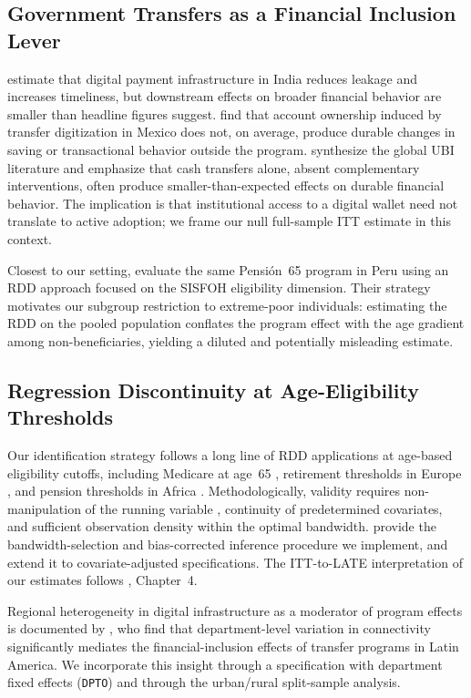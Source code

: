 \documentclass[12pt]{article}
\begin{document}
\subsection{Government Transfers as a Financial Inclusion Lever}

\citet{muralidharan2016} estimate that digital payment infrastructure in
India reduces leakage and increases timeliness, but downstream effects on
broader financial behavior are smaller than headline figures suggest.
\citet{bachas2018} find that account ownership induced by transfer
digitization in Mexico does not, on average, produce durable changes in
saving or transactional behavior outside the program. \citet{banerjee2020}
synthesize the global UBI literature and emphasize that cash transfers
alone, absent complementary interventions, often produce smaller-than-expected
effects on durable financial behavior. The implication is that institutional
access to a digital wallet need not translate to active adoption; we frame
our null full-sample ITT estimate in this context.

Closest to our setting, \citet{bando2020} evaluate the same Pensi\'on~65
program in Peru using an RDD approach focused on the SISFOH eligibility
dimension. Their strategy motivates our subgroup restriction to extreme-poor
individuals: estimating the RDD on the pooled population conflates the
program effect with the age gradient among non-beneficiaries, yielding a
diluted and potentially misleading estimate.

\subsection{Regression Discontinuity at Age-Eligibility Thresholds}

Our identification strategy follows a long line of RDD applications at
age-based eligibility cutoffs, including Medicare at age~65 \citep{card2008},
retirement thresholds in Europe \citep{battistin2009}, and pension thresholds
in Africa \citep{ardington2016}. Methodologically, validity requires
non-manipulation of the running variable \citep{cattaneo2018}, continuity of
predetermined covariates, and sufficient observation density within the
optimal bandwidth. \citet{calonico2014} provide the bandwidth-selection and
bias-corrected inference procedure we implement, and \citet{calonico2019}
extend it to covariate-adjusted specifications. The ITT-to-LATE
interpretation of our estimates follows \citet{angrist2009}, Chapter~4.

Regional heterogeneity in digital infrastructure as a moderator of
program effects is documented by \citet{suhrcke2024}, who find that
department-level variation in connectivity significantly mediates the
financial-inclusion effects of transfer programs in Latin America. We
incorporate this insight through a specification with department fixed
effects (\texttt{DPTO}) and through the urban/rural split-sample analysis.
\end{document}
